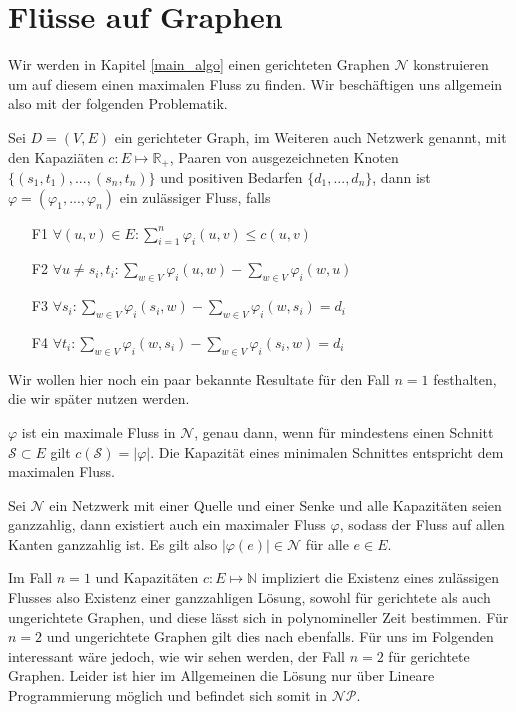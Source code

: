 \section{Flüsse auf Graphen}

Wir werden in Kapitel \ref{main_algo} einen gerichteten Graphen $\mathcal{N}$ konstruieren um auf diesem einen maximalen Fluss zu finden. Wir beschäftigen uns allgemein also mit der folgenden Problematik.

\begin{definition}\label{def_multi_flow}
Sei $D=(V,E)$ ein gerichteter Graph, im Weiteren auch Netzwerk genannt, mit den Kapaziäten $c:E\mapsto\mathbb{R}_{+}$, Paaren von ausgezeichneten Knoten $\{(s_1,t_1), ... ,(s_n,t_n)\}$ und positiven Bedarfen $\{d_1, ... ,d_n\}$, dann ist $\varphi=(\varphi_1, ... ,\varphi_n)$ ein zulässiger Fluss, falls
\begin{itemize}
\item[F1] $\forall (u,v) \in E : \sum_{i=1}^{n}{\varphi_i(u,v)} \leq c(u,v) $
\item[F2] $ \forall u \neq s_i,t_i : \sum_{w \in V} \varphi_i(u,w) - \sum_{w \in V} \varphi_i(w,u) $
\item[F3] $ \forall s_i : \sum_{w \in V} \varphi_i(s_i,w) - \sum_{w \in V} \varphi_i(w,s_i) = d_i $
\item[F4] $ \forall t_i : \sum_{w \in V} \varphi_i(w,s_i) - \sum_{w \in V} \varphi_i(s_i,w) = d_i $
\end{itemize}
\end{definition}

Wir wollen hier noch ein paar bekannte Resultate für den Fall $n=1$ festhalten, die wir später nutzen werden.

\begin{theorem}
$\varphi$ ist ein maximale Fluss in $\mathcal{N}$, genau dann, wenn für mindestens einen Schnitt $\mathcal{S} \subset E$ gilt $c(\mathcal{S}) = |\varphi|$. Die Kapazität eines minimalen Schnittes entspricht dem maximalen Fluss.
\end{theorem}

\begin{theorem}\label{theo_int_flow}
Sei $\mathcal{N}$ ein Netzwerk mit einer Quelle und einer Senke und alle Kapazitäten seien ganzzahlig, dann existiert auch ein maximaler Fluss $\varphi$, sodass der Fluss auf allen Kanten ganzzahlig ist. Es gilt also $|\varphi(e)| \in \mathcal{N}$ für alle $e\in E$.
\end{theorem}

\begin{remark}
Im Fall $n=1$ und Kapazitäten $c:E\mapsto\mathbb{N}$ impliziert die Existenz eines zulässigen Flusses also Existenz einer ganzzahligen Lösung, sowohl für gerichtete als auch ungerichtete Graphen, und diese lässt sich in polynomineller Zeit bestimmen. Für $n=2$ und ungerichtete Graphen gilt dies nach \cite{hu} ebenfalls. Für uns im Folgenden interessant wäre jedoch, wie wir sehen werden, der Fall $n=2$ für gerichtete Graphen. Leider ist hier im Allgemeinen die Lösung nur über Lineare Programmierung möglich und befindet sich somit in $\mathcal{NP}$.
\end{remark}